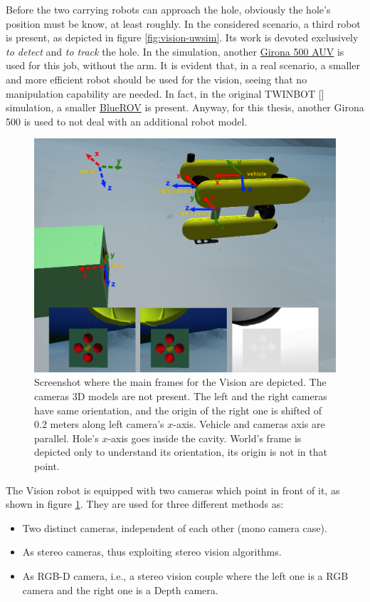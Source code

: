 Before the two carrying robots can approach the hole, obviously the hole's position must be know, at least roughly.
In the considered scenario, a third robot is present, as depicted in figure \ref{fig:vision-uwsim}. Its work is devoted exclusively \textit{to detect} and \textit{to track} the hole. In the simulation, another \href{https://cirs.udg.edu/auvs-technology/auvs/girona-500-auv/}{Girona 500 AUV} is used for this job, without the arm. It is evident that, in a real scenario, a smaller and more efficient robot should be used for the vision, seeing that no manipulation capability are needed. In fact, in the original TWINBOT [\cite{TWINBOT2019}] simulation, a smaller \href{https://bluerobotics.com/product-category/rov/bluerov2/}{BlueROV} is present.
Anyway, for this thesis, another Girona 500 is used to not deal with an additional robot model.\\

\begin{figure}[H]
	\centering
	\includegraphics[width=12.5cm]{frameVision.png}
	\caption[Main frames of the Vision scenario]{Screenshot where the main frames for the Vision are depicted. The cameras 3D models are not present. The left and the right cameras have same orientation, and the origin of the right one is shifted of 0.2 meters along left camera's $x$-axis. Vehicle and cameras axis are parallel. Hole's $x$-axis goes inside the cavity. World's frame is depicted only to understand its orientation, its origin is not in that point.}
	\label{fig:visionFrames}
\end{figure}

The Vision robot is equipped with two cameras which point in front of it, as shown in figure \ref{fig:visionFrames}. They are used for three different methods as:
\begin{itemize}
	\item Two distinct cameras, independent of each other (mono camera case).
	\item As stereo cameras, thus exploiting stereo vision algorithms.
	\item As RGB-D camera, i.e., a stereo vision couple where the left one is a RGB camera and the right one is a Depth camera.  
\end{itemize} 

